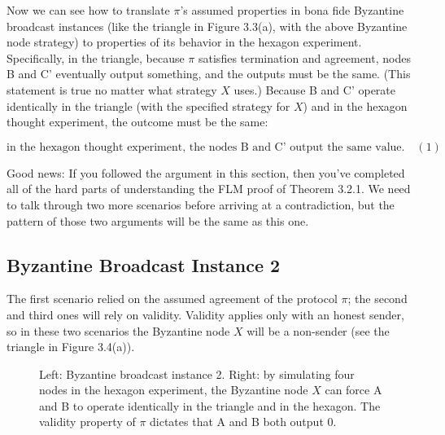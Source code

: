 Now we can see how to translate $\pi$’s assumed properties in bona fide Byzantine broadcast instances (like the triangle in Figure 3.3(a), with the above Byzantine node strategy) to properties of its behavior in the hexagon experiment. Specifically, in the triangle, because
$\pi$ satisfies termination and agreement, nodes B and C' eventually output something, and
the outputs must be the same. (This statement is true no matter what strategy $X$ uses.)
Because B and C' operate identically in the triangle (with the specified strategy for $X$) and
in the hexagon thought experiment, the outcome must be the same:

$$\text{in the hexagon thought experiment, the nodes B and C' output the same value.} \quad (1)$$

Good news: If you followed the argument in this section, then you've completed all of the
hard parts of understanding the FLM proof of Theorem 3.2.1. We need to talk through two
more scenarios before arriving at a contradiction, but the pattern of those two arguments
will be the same as this one.

\subsection{Byzantine Broadcast Instance 2}
The first scenario relied on the assumed agreement of the protocol $\pi$; the second and third
ones will rely on validity. Validity applies only with an honest sender, so in these two
scenarios the Byzantine node $X$ will be a non-sender (see the triangle in Figure 3.4(a)).
\begin{figure}[h]
    \centering
    \qquad
    \caption{Left: Byzantine broadcast instance 2. Right: by simulating four nodes in the
    hexagon experiment, the Byzantine node $X$ can force A and B to operate identically in the
    triangle and in the hexagon. The validity property of $\pi$ dictates that A and B both output 0.}
    \label{fig:example}%
\end{figure}\\

